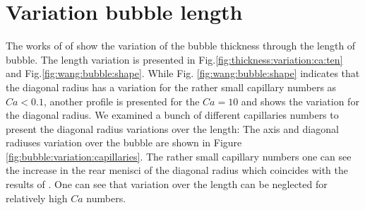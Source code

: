 \documentclass{article}
\begin{document}
\section{Variation bubble length}
The works of \citet{heil-threedim} of \citet{wang-non-circular} show the variation of the bubble
thickness through the length of
bubble. The length variation is presented in Fig.\ref{fig:thickness:variation:ca:ten} and
Fig.\ref{fig:wang:bubble:shape}. While Fig. \ref{fig:wang:bubble:shape} indicates that the diagonal
radius has a variation for the rather small capillary numbers as $Ca<0.1$, another profile is
presented for the $Ca=10$ and shows the variation for the diagonal radius. We examined a bunch of
different capillaries numbers to present the diagonal radius variations over the length:
The axis and diagonal radiuses variation over the bubble are shown in Figure
\ref{fig:bubble:variation:capillaries}. The rather small capillary numbers one can see the increase
in the rear menisci of the diagonal radius which coincides with the results of
\citet{wang-non-circular}. One can see that variation over the length can be neglected
for relatively high $Ca$ numbers. 
\end{document}
